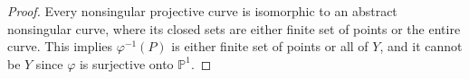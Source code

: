 \documentclass[12pt]{article}
\newcommand{\PP}{\mathbb{P}}
\theoremstyle{definition}
\begin{document}
\begin{enumerate} [label=\textbf{\arabic*.}, leftmargin=-0.05em]
\begin{proof}
  Every nonsingular projective curve is isomorphic to an abstract nonsingular curve, where its closed sets are either finite set of points or the entire curve. This implies $\varphi^{-1}(P)$ is either finite set of points or all of $Y$, and it cannot be $Y$ since $\varphi$ is surjective onto $\PP^1$.
\end{proof}

\end{enumerate}
\end{document}
